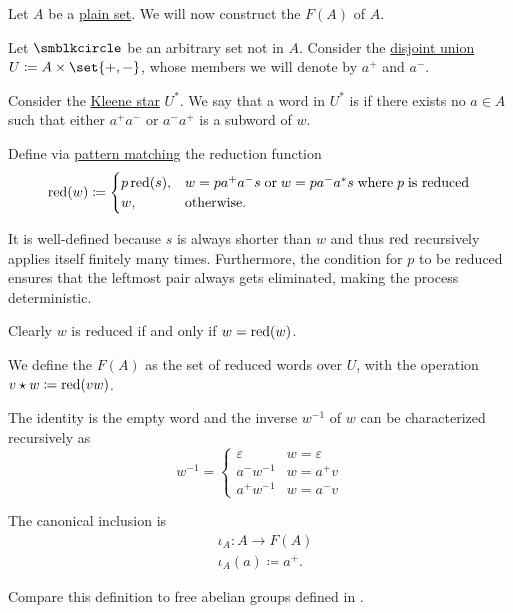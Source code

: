 \begin{definition}\label{def:free_group}
  Let \( A \) be a \hyperref[def:set]{plain set}. We will now construct the  \( F(A) \) of \( A \).

  Let \( \anon \) be an arbitrary set not in \( A \). Consider the \hyperref[def:disjoint_union]{disjoint union} \( U \coloneqq A \times \set{ +, - } \), whose members we will denote by \( a^+ \) and \( a^- \).

  Consider the \hyperref[def:formal_language/kleene_star]{Kleene star} \( U^* \). We say that a word in \( U^* \) is  if there exists no \( a \in A \) such that either \( a^+ a^- \) or \( a^- a^+ \) is a subword of \( w \).

  Define via \hyperref[rem:evaluation]{pattern matching} the reduction function
  \begin{equation*}
    \red(w) \coloneqq \begin{cases}
      p \red(s), &w = p a^+ a^- s \T{or} w = p a^- a^* s \T{where} p \T{is reduced} \\
      w,               &\T{otherwise.}
    \end{cases}
  \end{equation*}

  It is well-defined because \( s \) is always shorter than \( w \) and thus \( \operatorname{red} \) recursively applies itself finitely many times. Furthermore, the condition for \( p \) to be reduced ensures that the leftmost pair always gets eliminated, making the process deterministic.

  Clearly \( w \) is reduced if and only if \( w = \operatorname{red}(w) \).

  We define the  \( F(A) \) as the set of reduced words over \( U \), with the operation \( v \star w \coloneqq \operatorname{red}(vw) \).

  The identity is the empty word and the inverse \( w^{-1} \) of \( w \) can be characterized recursively as
  \begin{equation*}
    w^{-1} = \begin{cases}
      \varepsilon &w = \varepsilon \\
      a^- w^{-1}  &w = a^+ v \\
      a^+ w^{-1}  &w = a^- v
    \end{cases}
  \end{equation*}

  The canonical inclusion is
  \begin{equation*}
    \begin{aligned}
      &\iota_A: A \to F(A) \\
      &\iota_A(a) \coloneqq a^+.
    \end{aligned}
  \end{equation*}

  Compare this definition to free abelian groups defined in .
\end{definition}


